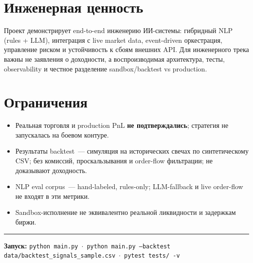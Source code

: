 \documentclass[10pt,a4paper]{article}
\begin{document}
\section*{Инженерная ценность}
Проект демонстрирует end-to-end инженерию ИИ-системы: гибридный NLP (rules + LLM), интеграция с live market data, event-driven оркестрация, управление риском и устойчивость к сбоям внешних API. Для инженерного трека важны не заявления о доходности, а воспроизводимая архитектура, тесты, observability и честное разделение sandbox/backtest vs production.

\section*{Ограничения}
\begin{itemize}
  \item Реальная торговля и production PnL \textbf{не подтверждались}; стратегия не запускалась на боевом контуре.
  \item Результаты backtest~--- симуляция на исторических свечах по синтетическому CSV; без комиссий, проскальзывания и order-flow фильтрации; не доказывают доходность.
  \item NLP eval corpus~--- hand-labeled, rules-only; LLM-fallback и live order-flow не входят в эти метрики.
  \item Sandbox-исполнение не эквивалентно реальной ликвидности и задержкам биржи.
\end{itemize}

\vspace{2pt}\hrule\vspace{3pt}
\textbf{Запуск:} \texttt{python main.py} \,$\cdot$\, \texttt{python main.py --backtest data/backtest\_signals\_sample.csv} \,$\cdot$\, \texttt{pytest tests/ -v}
\end{document}
